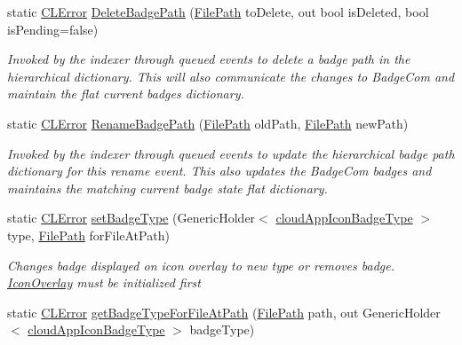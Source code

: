\begin{DoxyCompactItemize}
static \hyperlink{class_cloud_api_public_1_1_model_1_1_c_l_error}{C\-L\-Error} \hyperlink{class_cloud_api_public_1_1_badge_n_e_t_1_1_icon_overlay_a866f6571484e3d57489973d13560af79}{Delete\-Badge\-Path} (\hyperlink{class_cloud_api_public_1_1_model_1_1_file_path}{File\-Path} to\-Delete, out bool is\-Deleted, bool is\-Pending=false)
\begin{DoxyCompactList}\small\item\em Invoked by the indexer through queued events to delete a badge path in the hierarchical dictionary. This will also communicate the changes to Badge\-Com and maintain the flat current badges dictionary. \end{DoxyCompactList}\item 
static \hyperlink{class_cloud_api_public_1_1_model_1_1_c_l_error}{C\-L\-Error} \hyperlink{class_cloud_api_public_1_1_badge_n_e_t_1_1_icon_overlay_a81102aae58189aa619fbe2fd59feb79d}{Rename\-Badge\-Path} (\hyperlink{class_cloud_api_public_1_1_model_1_1_file_path}{File\-Path} old\-Path, \hyperlink{class_cloud_api_public_1_1_model_1_1_file_path}{File\-Path} new\-Path)
\begin{DoxyCompactList}\small\item\em Invoked by the indexer through queued events to update the hierarchical badge path dictionary for this rename event. This also updates the Badge\-Com badges and maintains the matching current badge state flat dictionary. \end{DoxyCompactList}\item 
static \hyperlink{class_cloud_api_public_1_1_model_1_1_c_l_error}{C\-L\-Error} \hyperlink{class_cloud_api_public_1_1_badge_n_e_t_1_1_icon_overlay_aef637c9c2436e382a414f57b41616a7f}{set\-Badge\-Type} (Generic\-Holder$<$ \hyperlink{namespace_cloud_api_public_1_1_badge_n_e_t_afab91a750338fef6bd4ef08f5381c4e4}{cloud\-App\-Icon\-Badge\-Type} $>$ type, \hyperlink{class_cloud_api_public_1_1_model_1_1_file_path}{File\-Path} for\-File\-At\-Path)
\begin{DoxyCompactList}\small\item\em Changes badge displayed on icon overlay to new type or removes badge. \hyperlink{class_cloud_api_public_1_1_badge_n_e_t_1_1_icon_overlay}{Icon\-Overlay} must be initialized first \end{DoxyCompactList}\item 
static \hyperlink{class_cloud_api_public_1_1_model_1_1_c_l_error}{C\-L\-Error} \hyperlink{class_cloud_api_public_1_1_badge_n_e_t_1_1_icon_overlay_ad7bae47f9ab165fecf5c4340e852dc97}{get\-Badge\-Type\-For\-File\-At\-Path} (\hyperlink{class_cloud_api_public_1_1_model_1_1_file_path}{File\-Path} path, out Generic\-Holder$<$ \hyperlink{namespace_cloud_api_public_1_1_badge_n_e_t_afab91a750338fef6bd4ef08f5381c4e4}{cloud\-App\-Icon\-Badge\-Type} $>$ badge\-Type)

\end{DoxyCompactItemize}
